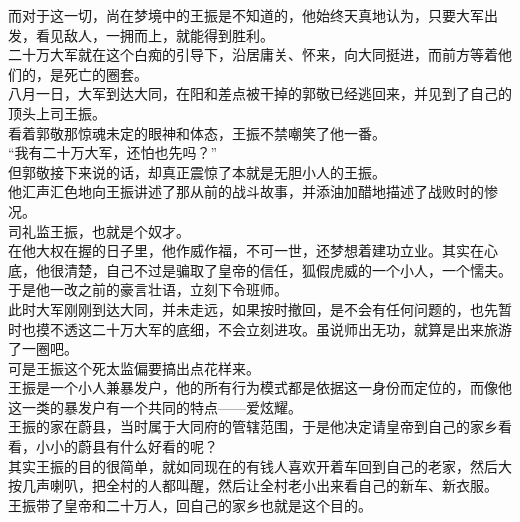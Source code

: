 \begin{multicols}{\theparacolNo}
而对于这一切，尚在梦境中的王振是不知道的，他始终天真地认为，只要大军出发，看见敌人，一拥而上，就能得到胜利。\\

二十万大军就在这个白痴的引导下，沿居庸关、怀来，向大同挺进，而前方等着他们的，是死亡的圈套。\\

八月一日，大军到达大同，在阳和差点被干掉的郭敬已经逃回来，并见到了自己的顶头上司王振。\\

看着郭敬那惊魂未定的眼神和体态，王振不禁嘲笑了他一番。\\

“我有二十万大军，还怕也先吗？”\\

但郭敬接下来说的话，却真正震惊了本就是无胆小人的王振。\\

他汇声汇色地向王振讲述了那从前的战斗故事，并添油加醋地描述了战败时的惨况。\\

司礼监王振，也就是个奴才。\\

在他大权在握的日子里，他作威作福，不可一世，还梦想着建功立业。其实在心底，他很清楚，自己不过是骗取了皇帝的信任，狐假虎威的一个小人，一个懦夫。\\

于是他一改之前的豪言壮语，立刻下令班师。\\

此时大军刚刚到达大同，并未走远，如果按时撤回，是不会有任何问题的，也先暂时也摸不透这二十万大军的底细，不会立刻进攻。虽说师出无功，就算是出来旅游了一圈吧。\\

可是王振这个死太监偏要搞出点花样来。\\

王振是一个小人兼暴发户，他的所有行为模式都是依据这一身份而定位的，而像他这一类的暴发户有一个共同的特点——爱炫耀。\\

王振的家在蔚县，当时属于大同府的管辖范围，于是他决定请皇帝到自己的家乡看看，小小的蔚县有什么好看的呢？\\

其实王振的目的很简单，就如同现在的有钱人喜欢开着车回到自己的老家，然后大按几声喇叭，把全村的人都叫醒，然后让全村老小出来看自己的新车、新衣服。\\

王振带了皇帝和二十万人，回自己的家乡也就是这个目的。\\


\end{multicols}
